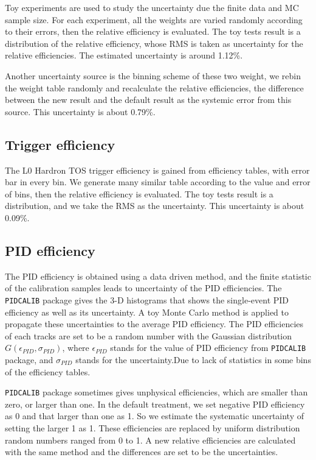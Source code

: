 Toy experiments are used to study the uncertainty due the finite data and MC sample size. 
For each experiment, 
all the weights are varied randomly according to their errors, 
then the relative efficiency is evaluated. 
The toy tests result is a distribution of the relative efficiency, 
whose RMS is taken as uncertainty for the relative efficiencies.
The estimated uncertainty is around 1.12\%.

Another uncertainty source is the binning scheme of these two weight, 
we rebin the weight table randomly and recalculate the relative efficiencies, 
the difference between the new result and the default result as the systemic error from this source. 
This uncertainty is about 0.79\%.

\subsection{Trigger efficiency}

The L0 Hardron TOS trigger efficiency is gained from efficiency tables, 
with error bar in every bin. 
We generate many similar table according to the value and error of bins, 
then the relative efficiency is evaluated. The toy tests result is a distribution, 
and we take the RMS as the uncertainty. 
This uncertainty is about 0.09\%.


\subsection{PID efficiency}
\label{sec:pideff}
The PID efficiency is obtained using a data driven method, 
and the finite statistic of the calibration samples leads to uncertainty of the PID efficiencies. 
The \texttt{PIDCALIB} package gives the 3-D histograms that shows the single-event PID efficiency as well as its uncertainty.  
A toy Monte Carlo method is applied to propagate these uncertainties to the average PID efficiency. 
The PID efficiencies of each tracks are set to be a random number with the Gaussian distribution $G(\epsilon_{PID}, \sigma_{PID})$, 
where $\epsilon_{PID}$ stands for the value of PID efficiency from \texttt{PIDCALIB} package, 
and $\sigma_{PID}$ stands for the uncertainty.Due to lack of statistics in some bins of the efficiency tables.


\texttt{PIDCALIB} package sometimes gives unphysical efficiencies, 
which are smaller than zero, or larger than one. 
In the default treatment, 
we set negative PID efficiency as 0 and that larger than one as 1. 
So we estimate the systematic uncertainty of setting the larger 1 as 1. 
These efficiencies are replaced by uniform distribution random numbers ranged from 0 to 1. 
A new relative efficiencies are calculated with the same method and the differences are set to be the uncertainties.

